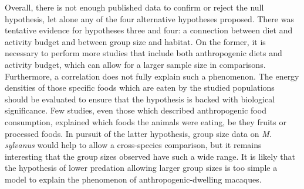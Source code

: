 \documentclass{../../../coursework}
\begin{document}
Overall, there is not enough published data to confirm or reject the null
hypothesis, let alone any of the four alternative hypotheses proposed. There
was tentative evidence for hypotheses three and four: a connection between
diet and activity budget and between group size and habitat. On the former, it
is necessary to perform more studies that include both anthropogenic diets and
activity budget, which can allow for a larger sample size in comparisons.
Furthermore, a correlation does not fully explain such a phenomenon. The
energy densities of those specific foods which are eaten by the studied
populations should be evaluated to ensure that the hypothesis is backed with
biological significance. Few studies, even those which described anthropogenic
food consumption, explained which foods the animals were eating, be they
fruits or processed foods. In pursuit of the latter hypothesis, group size
data on \textit{M. sylvanus} would help to allow a cross-species comparison,
but it remains interesting that the group sizes observed have such a wide
range. It is likely that the hypothesis of lower predation allowing larger
group sizes is too simple a model to explain the phenomenon of
anthropogenic-dwelling macaques.

\printbibliography
\end{document}
